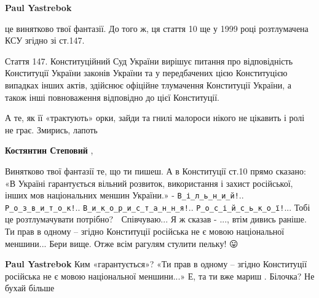\begin{itemize}
\begin{itemize}
 
\textbf{Paul Yastrebok} 

це винятково твої фантазії. До того ж, ця стаття 10 ще у 1999 році розтлумачена
КСУ згідно зі ст.147.

Стаття 147. Конституційний Суд України вирішує питання про відповідність
Конституції України законів України та у передбачених цією Конституцією
випадках інших актів, здійснює офіційне тлумачення Конституції України, а також
інші повноваження відповідно до цієї Конституції.

А те, як її «трактують» орки, зайди та гнилі малороси нікого не цікавить і ролі
не грає. Змирись, лапоть

 
\textbf{Костянтин Степовий} , 

Винятково твої фантазії те, що ти пишеш. А в Конституції ст.10 прямо сказано:
«В Україні гарантується вільний розвиток, використання і захист російської,
інших мов національних меншин України.» - \verb|В_і_л_ь_н_и_й!|.. \verb|Р_о_з_в_и_т_о_к!|..
\verb|В_и_к_о_р_и_с_т_а_н_н_я!|.. \verb|Р_о_с_і_й_с_ь_к_о_ї!|... Тобі це розтлумачувати
потрібно? 🤣 Співчуваю... Я ж сказав - ..., втім дивись раніше. Ти прав в
одному – згідно Конституції російська не є мовою національної меншини... Бери
вище. Отже всім рагулям стулити пельку! 😛

 
\textbf{Paul Yastrebok} Ким «гарантується»?
«Ти прав в одному – згідно Конституції російська не є мовою національної меншини...»
Е, та ти вже мариш . Білочка? Не бухай більше

 

\end{itemize}
\end{itemize}
